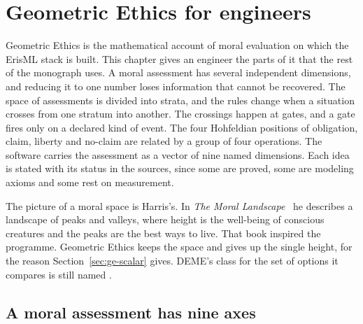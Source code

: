 \chapter{Geometric Ethics for engineers}\label{ch:ge}

Geometric Ethics is the mathematical account of moral evaluation on which the ErisML stack is
built. This chapter gives an engineer the parts of it that the rest of the monograph uses. A moral
assessment has several independent dimensions, and reducing it to one number loses information
that cannot be recovered. The space of assessments is divided into strata, and the rules change
when a situation crosses from one stratum into another. The crossings happen at gates, and a gate
fires only on a declared kind of event. The four Hohfeldian positions of obligation, claim,
liberty and no-claim are related by a group of four operations. The software carries the
assessment as a vector of nine named dimensions. Each idea is stated with its status in the
sources, since some are proved, some are modeling axioms and some rest on measurement.

The picture of a moral space is Harris's. In \emph{The Moral Landscape}~\cite{harris2010moral} he
describes a landscape of peaks and valleys, where height is the well-being of conscious creatures
and the peaks are the best ways to live. That book inspired the programme. Geometric Ethics keeps
the space and gives up the single height, for the reason Section~\ref{sec:ge-scalar} gives. DEME's
class for the set of options it compares is still named .

\section{A moral assessment has nine axes}\label{sec:ge-space}

